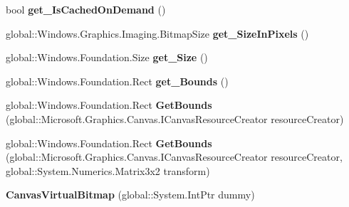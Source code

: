 \begin{DoxyCompactItemize}
bool {\bfseries get\+\_\+\+Is\+Cached\+On\+Demand} ()
\item 
\mbox{\label{class_microsoft_1_1_graphics_1_1_canvas_1_1_canvas_virtual_bitmap_a439d7c35ef18134d0591a7224da39d45}} 
global\+::\+Windows.\+Graphics.\+Imaging.\+Bitmap\+Size {\bfseries get\+\_\+\+Size\+In\+Pixels} ()
\item 
\mbox{\label{class_microsoft_1_1_graphics_1_1_canvas_1_1_canvas_virtual_bitmap_a3666de30987670dccd0b71e58afa0622}} 
global\+::\+Windows.\+Foundation.\+Size {\bfseries get\+\_\+\+Size} ()
\item 
\mbox{\label{class_microsoft_1_1_graphics_1_1_canvas_1_1_canvas_virtual_bitmap_a6664a6235d655fc26b219ad204fef7ae}} 
global\+::\+Windows.\+Foundation.\+Rect {\bfseries get\+\_\+\+Bounds} ()
\item 
\mbox{\label{class_microsoft_1_1_graphics_1_1_canvas_1_1_canvas_virtual_bitmap_a23dbbaf8b46875ac886417621e2ffd2e}} 
global\+::\+Windows.\+Foundation.\+Rect {\bfseries Get\+Bounds} (global\+::\+Microsoft.\+Graphics.\+Canvas.\+I\+Canvas\+Resource\+Creator resource\+Creator)
\item 
\mbox{\label{class_microsoft_1_1_graphics_1_1_canvas_1_1_canvas_virtual_bitmap_aaa158707cfd84b8d995986896e041c86}} 
global\+::\+Windows.\+Foundation.\+Rect {\bfseries Get\+Bounds} (global\+::\+Microsoft.\+Graphics.\+Canvas.\+I\+Canvas\+Resource\+Creator resource\+Creator, global\+::\+System.\+Numerics.\+Matrix3x2 transform)
\item 
\mbox{\label{class_microsoft_1_1_graphics_1_1_canvas_1_1_canvas_virtual_bitmap_aeaea1d4461bcea11a0a08b9543be5651}} 
{\bfseries Canvas\+Virtual\+Bitmap} (global\+::\+System.\+Int\+Ptr dummy)
\item 
\mbox{\label{class_microsoft_1_1_graphics_1_1_canvas_1_1_canvas_virtual_bitmap_aaf949a1a2cfd013fee6beb63ae18107c}} 

\end{DoxyCompactItemize}
